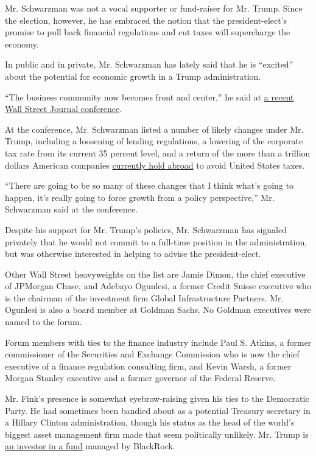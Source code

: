 Mr. Schwarzman was not a vocal supporter or fund-raiser for Mr. Trump.
Since the election, however, he has embraced the notion that the
president-elect's promise to pull back financial regulations and cut
taxes will supercharge the economy.

In public and in private, Mr. Schwarzman has lately said that he is
``excited'' about the potential for economic growth in a Trump
administration.

``The business community now becomes front and center,'' he said at
\href{http://www.wsj.com/video/blackstone-ceo-on-job-growth-under-president-trump/6F1E8405-F028-4ACC-B40B-551CA010EC36.html}{a
recent Wall Street Journal conference}.

At the conference, Mr. Schwarzman listed a number of likely changes
under Mr. Trump, including a loosening of lending regulations, a
lowering of the corporate tax rate from its current 35 percent level,
and a return of the more than a trillion dollars American companies
\href{http://www.cnbc.com/2016/09/20/us-companies-are-hoarding-2-and-a-half-trillion-dollars-in-cash-overseas.html}{currently
hold abroad} to avoid United States taxes.

``There are going to be so many of these changes that I think what's
going to happen, it's really going to force growth from a policy
perspective,'' Mr. Schwarzman said at the conference.

Despite his support for Mr. Trump's policies, Mr. Schwarzman has
signaled privately that he would not commit to a full-time position in
the administration, but was otherwise interested in helping to advise
the president-elect.

Other Wall Street heavyweights on the list are Jamie Dimon, the chief
executive of JPMorgan Chase, and Adebayo Ogunlesi, a former Credit
Suisse executive who is the chairman of the investment firm Global
Infrastructure Partners. Mr. Ogunlesi is also a board member at Goldman
Sachs. No Goldman executives were named to the forum.

Forum members with ties to the finance industry include Paul S. Atkins,
a former commissioner of the Securities and Exchange Commission who is
now the chief executive of a finance regulation consulting firm, and
Kevin Warsh, a former Morgan Stanley executive and a former governor of
the Federal Reserve.

Mr. Fink's presence is somewhat eyebrow-raising given his ties to the
Democratic Party. He had sometimes been bandied about as a potential
Treasury secretary in a Hillary Clinton administration, though his
status as the head of the world's biggest asset management firm made
that seem politically unlikely. Mr. Trump is
\href{http://mobile.reuters.com/article/idUSKCN0WQ0X0}{an investor in a
fund} managed by BlackRock.

